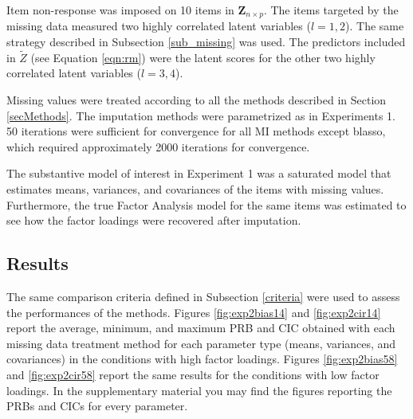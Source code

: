 
	Item non-response was imposed on 10 items in $\bm{Z}_{n \times p}$.
	The items targeted by the missing data measured two highly correlated latent variables ($l = 1, 2$).
	The same strategy described in Subsection \ref{sub_missing} was used.	
	The predictors included in $\tilde{Z}$ (see Equation \ref{eqn:rm}) were the latent scores for the other two highly 
	correlated latent variables ($l = 3, 4$).
	
	
	Missing values were treated according to all the methods described in Section \ref{secMethods}.
	The imputation methods were parametrized as in Experiments 1.
	50 iterations were sufficient for convergence for all MI methods except blasso, which required approximately 
	2000 iterations for convergence.

	
	The substantive model of interest in Experiment 1 was a saturated model that estimates means,
	variances, and covariances of the items with missing values.
	Furthermore, the true Factor Analysis model for the same items was estimated to see how the 
	factor loadings were recovered after imputation.

\subsection{Results}
	The same comparison criteria defined in Subsection \ref{criteria} were used to assess the performances of 
	the methods.
	Figures \ref{fig:exp2bias14} and \ref{fig:exp2cir14} report the average, minimum, and maximum PRB and CIC obtained
	with each missing data treatment method for each parameter type (means, variances, and covariances) in the 
	conditions with high factor loadings.
	Figures \ref{fig:exp2bias58} and \ref{fig:exp2cir58} report the same results for the conditions with low 
	factor loadings.
	In the supplementary material you may find the figures reporting the PRBs and CICs for every parameter.

